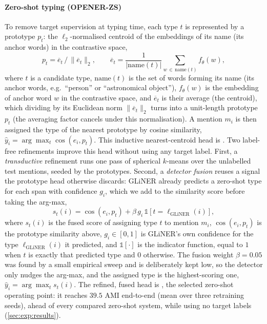 \paragraph{Zero-shot typing (OPENER-ZS)}
To remove target supervision at typing time, each type $t$ is represented by a prototype $p_t$: the $\ell_2$-normalised centroid of the embeddings of its name (its anchor words) in the contrastive space,
\begin{equation}
p_t = \overline{e}_t\,\big/\,\lVert \overline{e}_t\rVert_2,\qquad \overline{e}_t=\frac{1}{|\mathrm{name}(t)|}\!\!\sum_{w\,\in\,\mathrm{name}(t)}\!\!f_\theta(w),
\end{equation}
where $t$ is a candidate type, $\mathrm{name}(t)$ is the set of words forming its name (its anchor words, e.g.\ ``person'' or ``astronomical object''), $f_\theta(w)$ is the embedding of anchor word $w$ in the contrastive space, and $\overline{e}_t$ is their average (the centroid), which dividing by its Euclidean norm $\lVert\overline{e}_t\rVert_2$ turns into a unit-length prototype $p_t$ (the averaging factor cancels under this normalisation). A mention $m_i$ is then assigned the type of the nearest prototype by cosine similarity, $\hat y_i = \arg\max_t \cos(e_i, p_t)$. This inductive nearest-centroid head is \zsind.
Two label-free refinements improve this head without using any target label.
First, a \emph{transductive} refinement runs one pass of spherical $k$-means over the unlabelled test mentions, seeded by the prototypes.
Second, a \emph{detector fusion} reuses a signal the prototype head otherwise discards: GLiNER already predicts a zero-shot type for each span with confidence $g_i$, which we add to the similarity score before taking the arg-max,
\begin{equation}
s_t(i)=\cos(e_i,p_t)+\beta\,g_i\,\mathbb{1}\!\left[t=\ell_{\text{GLiNER}}(i)\right],
\end{equation}
where $s_t(i)$ is the fused score of assigning type $t$ to mention $m_i$, $\cos(e_i,p_t)$ is the prototype similarity above, $g_i\in[0,1]$ is GLiNER's own confidence for the type $\ell_{\text{GLiNER}}(i)$ it predicted, and $\mathbb{1}[\cdot]$ is the indicator function, equal to $1$ when $t$ is exactly that predicted type and $0$ otherwise. The fusion weight $\beta{=}0.05$ was found by a small empirical sweep and is deliberately kept low, so the detector only nudges the arg-max, and the assigned type is the highest-scoring one, $\hat y_i=\arg\max_t s_t(i)$.
The refined, fused head is \zstr, the selected zero-shot operating point: it reaches $39.5$ AMI end-to-end (mean over three retraining seeds), ahead of every compared zero-shot system, while using no target labels (\autoref{sec:exp:results}).

